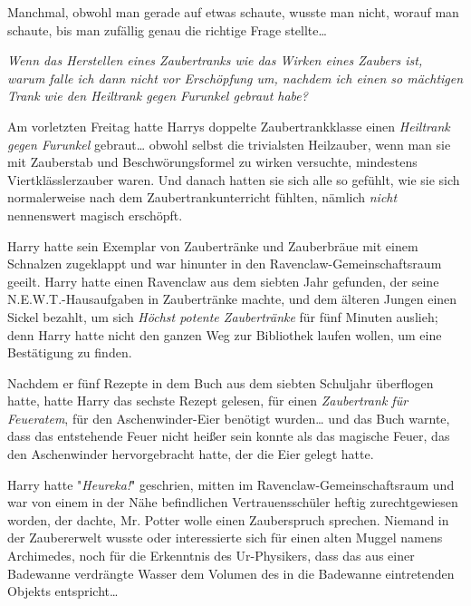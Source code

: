 {Manchmal, obwohl man gerade auf etwas schaute, wusste man nicht, worauf man schaute, bis man zufällig genau die richtige Frage stellte…

\emph{Wenn das Herstellen eines Zaubertranks wie das Wirken eines Zaubers ist, warum falle ich dann nicht vor Erschöpfung um, nachdem ich einen so mächtigen Trank wie den Heiltrank gegen Furunkel gebraut habe?}

Am vorletzten Freitag hatte Harrys doppelte Zaubertrankklasse einen \emph{Heiltrank gegen Furunkel} gebraut… obwohl selbst die trivialsten Heilzauber, wenn man sie mit Zauberstab und Beschwörungsformel zu wirken versuchte, mindestens Viertklässlerzauber waren. Und danach hatten sie sich alle so gefühlt, wie sie sich normalerweise nach dem Zaubertrankunterricht fühlten, nämlich \emph{nicht} nennenswert magisch erschöpft.

Harry hatte sein Exemplar von Zaubertränke und Zauberbräue mit einem Schnalzen zugeklappt und war hinunter in den Ravenclaw-Gemeinschaftsraum geeilt. Harry hatte einen Ravenclaw aus dem siebten Jahr gefunden, der seine N.E.W.T.-Hausaufgaben in Zaubertränke machte, und dem älteren Jungen einen Sickel bezahlt, um sich \emph{Höchst potente Zaubertränke} für fünf Minuten auslieh; denn Harry hatte nicht den ganzen Weg zur Bibliothek laufen wollen, um eine Bestätigung zu finden.

Nachdem er fünf Rezepte in dem Buch aus dem siebten Schuljahr überflogen hatte, hatte Harry das sechste Rezept gelesen, für einen \emph{Zaubertrank für Feueratem}, für den Aschenwinder-Eier benötigt wurden… und das Buch warnte, dass das entstehende Feuer nicht heißer sein konnte als das magische Feuer, das den Aschenwinder hervorgebracht hatte, der die Eier gelegt hatte.

Harry hatte "\emph{Heureka!}" geschrien, mitten im Ravenclaw-Gemeinschaftsraum und war von einem in der Nähe befindlichen Vertrauensschüler heftig zurechtgewiesen worden, der dachte, Mr. Potter wolle einen Zauberspruch sprechen. Niemand in der Zaubererwelt wusste oder interessierte sich für einen alten Muggel namens Archimedes, noch für die Erkenntnis des Ur-Physikers, dass das aus einer Badewanne verdrängte Wasser dem Volumen des in die Badewanne eintretenden Objekts entspricht…

}
